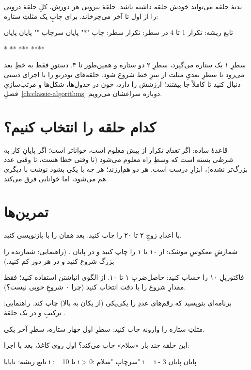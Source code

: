 بدنهٔ حلقه می‌تواند خودش حلقه داشته باشد. حلقهٔ بیرونی هر دورش، کلِ حلقهٔ
درونی را از اول تا آخر می‌چرخاند. برای چاپِ یک مثلثِ ستاره:

\begin{salamfa}
تابع ریشه:
    تکرار 1 تا 4 در سطر:
        تکرار سطر:
            چاپ "*"
        پایان
        سرچاپ ""
    پایان
پایان
\end{salamfa}

\begin{progout}
*
**
***
****
\end{progout}

سطرِ ۱ یک ستاره می‌گیرد، سطرِ ۲ دو ستاره و همین‌طور تا ۴. دستورِ
 فقط به خطِ بعد می‌رود تا سطرِ بعدیِ مثلث از سرِ خط شروع
شود. حلقه‌های تودرتو را با اجرای دستی دنبال کنید تا کاملاً جا بیفتند؛
ارزشش را دارد، چون در جدول‌ها، شکل‌ها و مرتب‌سازیِ فصلِ~\ref{ch:classic-algorithms} دوباره سراغشان می‌رویم.

\section{کدام حلقه را انتخاب کنیم؟}

قاعدهٔ ساده: اگر \emph{تعدادِ} تکرار از پیش معلوم است، 
خواناتر است؛ اگر پایانِ کار به \emph{شرطی} بسته است که وسطِ راه معلوم
می‌شود (تا وقتی خطا هست، تا وقتی عدد بزرگ‌تر نشده)،  ابزارِ
درست است. هر دو هم‌ارزند؛ هر چه با یکی بشود نوشت با دیگری هم می‌شود، اما
خوانایی فرق می‌کند.

\section{تمرین‌ها}

\exercise با  اعدادِ زوجِ ۲ تا ۲۰ را چاپ کنید. بعد همان را با
 بازنویسی کنید.

\exercise شمارشِ معکوسِ موشک: از ۱۰ تا ۱ را چاپ کنید و در پایان
. (راهنمایی: شمارنده را بزرگ شروع کنید و در هر دور کم کنید.)

\exercise فاکتوریلِ ۱۰ را حساب کنید: حاصل‌ضربِ ۱ تا ۱۰. از الگوی انباشتن
استفاده کنید؛ فقط مقدارِ شروع را با دقت انتخاب کنید (چرا ۰ شروعِ خوبی
نیست؟).

\exercise برنامه‌ای بنویسید که رقم‌های عددِ  را یکی‌یکی (از
یکان به بالا) چاپ کند. راهنمایی: ترکیبِ  و  در یک
حلقهٔ .

\exercise مثلثِ ستاره را وارونه چاپ کنید: سطرِ اول چهار ستاره، سطرِ آخر
یکی.

\exercise این حلقه چند بار «سلام» چاپ می‌کند؟ اول روی کاغذ، بعد با اجرا:
\begin{salamfa}
تابع ریشه:
    ناپایا i := 10
    تا i > 0:
        سرچاپ "سلام"
        i = i - 3
    پایان
پایان
\end{salamfa}
